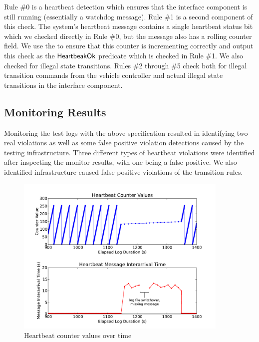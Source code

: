 Rule \#0 is a heartbeat detection which ensures that the interface component is still running (essentially a watchdog message). Rule \#1 is a second component of this check. The system's heartbeat message contains a single heartbeat status bit which we checked directly in Rule \#0, but the message also has a rolling counter field. We use the \sfmap to ensure that this counter is incrementing correctly and output this check as the $\mathsf{HeartbeakOk}$ predicate which is checked in Rule \#1.
We also checked for illegal state transitions. Rules \#2 through \#5 check both for illegal transition commands from the vehicle controller and actual illegal state transitions in the interface component.


\subsection{Monitoring Results}
Monitoring the test logs with the above specification resulted in identifying two real violations as well as some false positive violation detections caused by the testing infrastructure.
%
Three different types of heartbeat violations were identified after inspecting the monitor results, with one being a false positive.
We also identified infrastructure-caused false-positive violations of the transition rules.

\begin{figure}[htbp]
		\centering
		\includegraphics[width=4.0in]{img/hb1}
		\caption{Heartbeat counter values over time}
		\label{fig:hb_arrival}
\end{figure}

